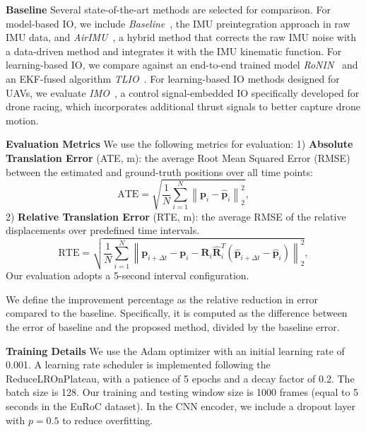 \noindent\textbf{Baseline} Several state-of-the-art methods are selected for comparison. For model-based IO, we include \textit{Baseline}~\cite{forster2015imu}, the IMU preintegration approach in raw IMU data, and \textit{AirIMU}~\cite{qiu2023airimu}, a hybrid method that corrects the raw IMU noise with a data-driven method and integrates it with the IMU kinematic function.
For learning-based IO, we compare against an end-to-end trained model \textit{RoNIN}~\cite{herath2020ronin} and an EKF-fused algorithm \textit{TLIO}~\cite{liu2020tlio}.
For learning-based IO methods designed for UAVs, we evaluate \textit{IMO}~\cite{CioffiRal2023}, a control signal-embedded IO specifically developed for drone racing, which incorporates additional thrust signals to better capture drone motion.

\noindent\textbf{Evaluation Metrics} We use the following metrics for evaluation: 1) \textbf{Absolute Translation Error} (ATE, $\si{\meter}$): the average Root Mean Squared Error (RMSE) between the estimated and ground-truth positions over all time points:
\begin{equation}
    \text{ATE} =\sqrt{\frac{1}{N}\sum^N_{i=1}{\left\| \mathbf{p}_{i} - \hat{\mathbf{p}}_{i}\right\|_2^2}},
\end{equation}
2) \textbf{Relative Translation Error} (RTE, $\si{\meter}$): the average RMSE of the relative displacements over predefined time intervals.
\begin{equation}
    \text{RTE} = \sqrt{ \frac{1}{N}\sum^N_{i=1}\left\| \mathbf{p}_{i+\Delta t} - \mathbf{p}_{i} - \mathbf{R}_{i}\hat{\mathbf{R}}_{i}^T \left(\hat{\mathbf{p}}_{i+\Delta t} - \hat{\mathbf{p}}_{i}\right)\right\|^2_2},
\end{equation}
Our evaluation adopts a 5-second interval configuration.

We define the improvement percentage as the relative reduction in error compared to the baseline. Specifically, it is computed as the difference between the error of baseline and the proposed method, divided by the baseline error.

\noindent\textbf{Training Details} We use the Adam optimizer with an initial learning rate of 0.001. A learning rate scheduler is implemented following the ReduceLROnPlateau, with a patience of 5 epochs and a decay factor of 0.2. The batch size is 128. Our training and testing window size is 1000 frames (equal to 5 seconds in the EuRoC dataset). In the CNN encoder, we include a dropout layer with $p=0.5$ to reduce overfitting.

